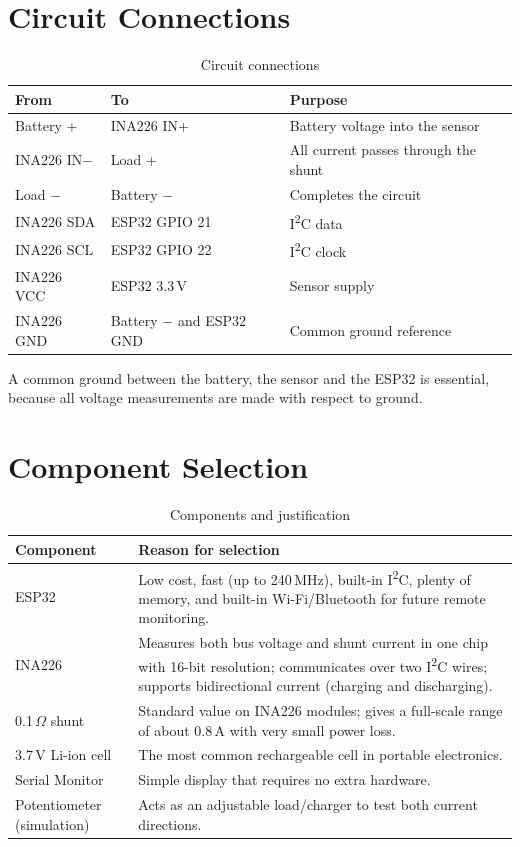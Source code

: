 \documentclass[12pt,a4paper,oneside]{report}
\begin{document}
\section{Circuit Connections}
\begin{table}[H]
\centering
\caption{Circuit connections}
\label{tab:conn}
\begin{tabularx}{\linewidth}{llX}
\toprule
\textbf{From} & \textbf{To} & \textbf{Purpose} \\
\midrule
Battery + & INA226 IN+ & Battery voltage into the sensor \\
INA226 IN$-$ & Load + & All current passes through the shunt \\
Load $-$ & Battery $-$ & Completes the circuit \\
INA226 SDA & ESP32 GPIO 21 & I\textsuperscript{2}C data \\
INA226 SCL & ESP32 GPIO 22 & I\textsuperscript{2}C clock \\
INA226 VCC & ESP32 3.3\,V & Sensor supply \\
INA226 GND & Battery $-$ and ESP32 GND & Common ground reference \\
\bottomrule
\end{tabularx}
\end{table}

A common ground between the battery, the sensor and the ESP32 is essential, because all voltage measurements are made with respect to ground.

\section{Component Selection}
\begin{table}[H]
\centering
\caption{Components and justification}
\label{tab:comp}
\begin{tabularx}{\linewidth}{lX}
\toprule
\textbf{Component} & \textbf{Reason for selection} \\
\midrule
ESP32 & Low cost, fast (up to 240\,MHz), built-in I\textsuperscript{2}C, plenty of memory, and built-in Wi-Fi/Bluetooth for future remote monitoring. \\
INA226 & Measures both bus voltage and shunt current in one chip with 16-bit resolution; communicates over two I\textsuperscript{2}C wires; supports bidirectional current (charging and discharging). \\
0.1\,$\Omega$ shunt & Standard value on INA226 modules; gives a full-scale range of about 0.8\,A with very small power loss. \\
3.7\,V Li-ion cell & The most common rechargeable cell in portable electronics. \\
Serial Monitor & Simple display that requires no extra hardware. \\
Potentiometer (simulation) & Acts as an adjustable load/charger to test both current directions. \\
\bottomrule
\end{tabularx}
\end{table}
\end{document}
